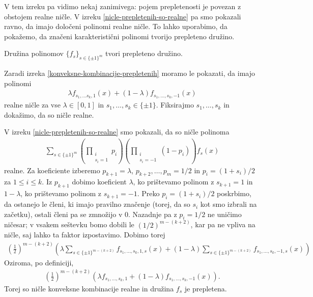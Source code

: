 V tem izreku pa vidimo nekaj zanimivega: pojem prepletenosti je povezan z obstojem realne ničle. V izreku \ref{nicle-prepletenih-so-realne} pa smo pokazali ravno, da imajo določeni polinomi realne ničle. To lahko uporabimo, da pokažemo, da značeni karakteristični polinomi tvorijo prepleteno družino.

\begin{izrek}\label{karakteristicni-so-prepleteni}
    Družina polinomov \(\{f_s\}_{s\in \{\pm 1\}^m}\) tvori prepleteno družino.
\end{izrek}
\begin{dokaz}
    Zaradi izreka \ref{konveksne-kombinacije-prepletenih} moramo le pokazati, da imajo polinomi
    \begin{align*}
        \lambda f_{s_1, \ldots s_k, 1}(x) + (1-\lambda)f_{s_1,\ldots, s_k, -1}(x)
    \end{align*}
    realne ničle za vse \(\lambda\in [0,1]\) in \(s_1, \ldots, s_k\in \{\pm 1\}\). Fiksirajmo \(s_1, \ldots, s_k\) in dokažimo, da so ničle realne.

    V izreku \ref{nicle-prepletenih-so-realne} smo pokazali, da so ničle polinoma
    \begin{align*}
        \sum_{s\in \{\pm 1\}^m} \left(\prod_{\substack{i \\s_i=1}} p_{i}\right) \left(\prod_{\substack{i\\s_i=-1}} (1- p_{i})\right) f_s(x)
    \end{align*}
    realne. Za koeficiente izberemo \(p_{k+1}=\lambda\), \(p_{k+2},\ldots, p_m=1/2\) in \(p_i = (1+s_i)/2\) za \(1\leq i\leq k\). Iz \(p_{k+1}\) dobimo koeficient \(\lambda\), ko prištevamo polinom z \(s_{k+1}=1\) in \(1-\lambda\), ko prištevamo polinom z \(s_{k+1} = -1\). Preko \(p_i = (1+s_i)/2\) poskrbimo, da ostanejo le členi, ki imajo pravilno značenje (torej, da so \(s_i\) kot smo izbrali na začetku), ostali členi pa se zmnožijo v \(0\). Nazadnje pa z \(p_i = 1/2\) ne uničimo ničesar; v vsakem seštevku bomo dobili le \((1/2)^{m-(k+2)}\), kar pa ne vpliva na ničle, saj lahko ta faktor izpostavimo. Dobimo torej 
    \begin{align*}
        \left(\frac12\right)^{m-(k+2)}\left(\lambda \sum_{s\in \{\pm 1\}^{m-(k+2)}}f_{s_1, \ldots, s_k, 1, s}(x) +(1-\lambda) \sum_{s\in \{\pm 1\}^{m-(k+2)}}f_{s_1, \ldots, s_k, -1, s}(x)\right)
    \end{align*}
    Oziroma, po definiciji,
    \begin{align*}
        \left(\frac12\right)^{m-(k+2)}(\lambda f_{s_1, \ldots, s_k, 1} + (1-\lambda)f_{s_1,\ldots, s_k, -1}(x)).
    \end{align*}
    Torej so ničle konveksne kombinacije realne in družina \(f_s\) je prepletena.
\end{dokaz}

